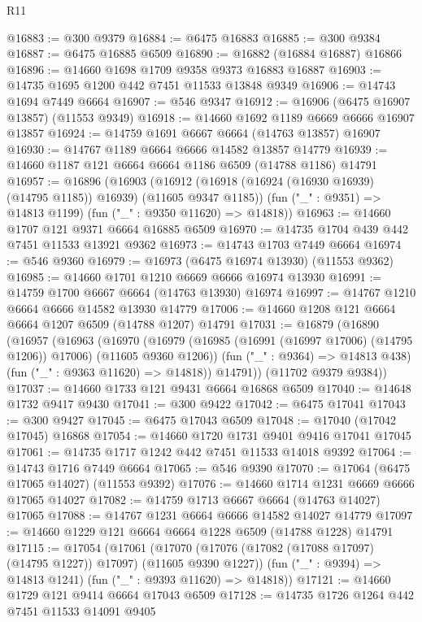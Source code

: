 \begin{lexlean}{R11}
\begin{coremodule}
@16883 := @300 @9379
@16884 := @6475 @16883
@16885 := @300 @9384
@16887 := @6475 @16885 @6509
@16890 := @16882 (@16884 @16887) @16866
@16896 := @14660 @1698 @1709 @9358 @9373 @16883 @16887
@16903 := @14735 @1695 @1200 @442 @7451 @11533 @13848 @9349
@16906 := @14743 @1694 @7449 @6664
@16907 := @546 @9347
@16912 := @16906 (@6475 @16907 @13857) (@11553 @9349)
@16918 := @14660 @1692 @1189 @6669 @6666 @16907 @13857
@16924 := @14759 @1691 @6667 @6664 (@14763 @13857) @16907
@16930 := @14767 @1189 @6664 @6666 @14582 @13857 @14779
@16939 := @14660 @1187 @121 @6664 @6664 @1186 @6509 (@14788 @1186) @14791
@16957 := @16896
    (@16903
      (@16912 (@16918 (@16924 (@16930 @16939) (@14795 @1185)) @16939) (@11605 @9347 @1185))
      (fun ("_" : @9351) => @14813 @1199)
      (fun ("_" : @9350 @11620) => @14818))
@16963 := @14660 @1707 @121 @9371 @6664 @16885 @6509
@16970 := @14735 @1704 @439 @442 @7451 @11533 @13921 @9362
@16973 := @14743 @1703 @7449 @6664
@16974 := @546 @9360
@16979 := @16973 (@6475 @16974 @13930) (@11553 @9362)
@16985 := @14660 @1701 @1210 @6669 @6666 @16974 @13930
@16991 := @14759 @1700 @6667 @6664 (@14763 @13930) @16974
@16997 := @14767 @1210 @6664 @6666 @14582 @13930 @14779
@17006 := @14660 @1208 @121 @6664 @6664 @1207 @6509 (@14788 @1207) @14791
@17031 := @16879
    (@16890
      (@16957
        (@16963
          (@16970
            (@16979 (@16985 (@16991 (@16997 @17006) (@14795 @1206)) @17006) (@11605 @9360 @1206))
            (fun ("_" : @9364) => @14813 @438)
            (fun ("_" : @9363 @11620) => @14818))
          @14791))
      (@11702 @9379 @9384))
@17037 := @14660 @1733 @121 @9431 @6664 @16868 @6509
@17040 := @14648 @1732 @9417 @9430
@17041 := @300 @9422
@17042 := @6475 @17041
@17043 := @300 @9427
@17045 := @6475 @17043 @6509
@17048 := @17040 (@17042 @17045) @16868
@17054 := @14660 @1720 @1731 @9401 @9416 @17041 @17045
@17061 := @14735 @1717 @1242 @442 @7451 @11533 @14018 @9392
@17064 := @14743 @1716 @7449 @6664
@17065 := @546 @9390
@17070 := @17064 (@6475 @17065 @14027) (@11553 @9392)
@17076 := @14660 @1714 @1231 @6669 @6666 @17065 @14027
@17082 := @14759 @1713 @6667 @6664 (@14763 @14027) @17065
@17088 := @14767 @1231 @6664 @6666 @14582 @14027 @14779
@17097 := @14660 @1229 @121 @6664 @6664 @1228 @6509 (@14788 @1228) @14791
@17115 := @17054
    (@17061
      (@17070 (@17076 (@17082 (@17088 @17097) (@14795 @1227)) @17097) (@11605 @9390 @1227))
      (fun ("_" : @9394) => @14813 @1241)
      (fun ("_" : @9393 @11620) => @14818))
@17121 := @14660 @1729 @121 @9414 @6664 @17043 @6509
@17128 := @14735 @1726 @1264 @442 @7451 @11533 @14091 @9405

\end{coremodule}
\end{lexlean}
